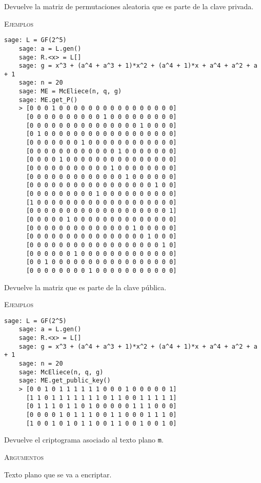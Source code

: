 \begin{description}[leftmargin=1em, font=\normalfont\ttfamily, style=nextline]
\begin{description}[font=\ttfamily, style=nextline]
  \item[get\_P(self)] Devuelve la matriz de permutaciones aleatoria que es parte de la clave privada.

  \textsc{Ejemplos}
  \begin{lstlisting}[gobble=4]
    sage: L = GF(2^5)
    sage: a = L.gen()
    sage: R.<x> = L[]
    sage: g = x^3 + (a^4 + a^3 + 1)*x^2 + (a^4 + 1)*x + a^4 + a^2 + a + 1
    sage: n = 20
    sage: ME = McEliece(n, q, g)
    sage: ME.get_P()
    > [0 0 0 1 0 0 0 0 0 0 0 0 0 0 0 0 0 0 0 0]
      [0 0 0 0 0 0 0 0 0 0 1 0 0 0 0 0 0 0 0 0]
      [0 0 0 0 0 0 0 0 0 0 0 0 0 0 0 1 0 0 0 0]
      [0 1 0 0 0 0 0 0 0 0 0 0 0 0 0 0 0 0 0 0]
      [0 0 0 0 0 0 0 1 0 0 0 0 0 0 0 0 0 0 0 0]
      [0 0 0 0 0 0 0 0 0 0 0 0 1 0 0 0 0 0 0 0]
      [0 0 0 0 1 0 0 0 0 0 0 0 0 0 0 0 0 0 0 0]
      [0 0 0 0 0 0 0 0 0 0 0 1 0 0 0 0 0 0 0 0]
      [0 0 0 0 0 0 0 0 0 0 0 0 0 1 0 0 0 0 0 0]
      [0 0 0 0 0 0 0 0 0 0 0 0 0 0 0 0 0 1 0 0]
      [0 0 0 0 0 0 0 0 0 1 0 0 0 0 0 0 0 0 0 0]
      [1 0 0 0 0 0 0 0 0 0 0 0 0 0 0 0 0 0 0 0]
      [0 0 0 0 0 0 0 0 0 0 0 0 0 0 0 0 0 0 0 1]
      [0 0 0 0 0 1 0 0 0 0 0 0 0 0 0 0 0 0 0 0]
      [0 0 0 0 0 0 0 0 0 0 0 0 0 0 1 0 0 0 0 0]
      [0 0 0 0 0 0 0 0 0 0 0 0 0 0 0 0 1 0 0 0]
      [0 0 0 0 0 0 0 0 0 0 0 0 0 0 0 0 0 0 1 0]
      [0 0 0 0 0 0 1 0 0 0 0 0 0 0 0 0 0 0 0 0]
      [0 0 1 0 0 0 0 0 0 0 0 0 0 0 0 0 0 0 0 0]
      [0 0 0 0 0 0 0 0 1 0 0 0 0 0 0 0 0 0 0 0]
  \end{lstlisting}

  \item[get\_public\_key(self)] Devuelve la matriz que es parte de la clave pública.

  \textsc{Ejemplos}
  \begin{lstlisting}[gobble=4]
    sage: L = GF(2^5)
    sage: a = L.gen()
    sage: R.<x> = L[]
    sage: g = x^3 + (a^4 + a^3 + 1)*x^2 + (a^4 + 1)*x + a^4 + a^2 + a + 1
    sage: n = 20
    sage: McEliece(n, q, g)
    sage: ME.get_public_key()
    > [0 0 1 0 1 1 1 1 1 1 0 0 0 1 0 0 0 0 0 1]
      [1 1 0 1 1 1 1 1 1 1 0 1 1 0 0 1 1 1 1 1]
      [0 1 1 1 0 1 1 0 1 0 0 0 0 0 1 1 1 0 0 0]
      [0 0 0 0 1 0 1 1 1 0 0 1 1 0 0 0 1 1 1 0]
      [1 0 0 1 0 1 0 1 1 0 0 1 1 0 0 1 0 0 1 0]
  \end{lstlisting}

  \item[encrypt(self, m)] Devuelve el criptograma asociado al texto plano \texttt{m}.

  \textsc{Argumentos}
  \begin{description}[font=\normalfont\ttfamily]
    \item[m] Texto plano que se va a encriptar.
  \end{description}


\end{description}
\end{description}
